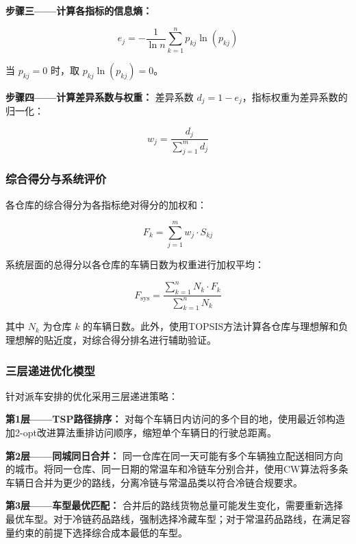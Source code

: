 \textbf{步骤三——计算各指标的信息熵：}

\begin{equation}\label{eq:entropy}
e_j = -\frac{1}{\ln n} \sum_{k=1}^{n} p_{kj} \ln(p_{kj})
\end{equation}

当 $p_{kj} = 0$ 时，取 $p_{kj}\ln(p_{kj}) = 0$。

\textbf{步骤四——计算差异系数与权重：} 差异系数 $d_j = 1 - e_j$，指标权重为差异系数的归一化：

\begin{equation}\label{eq:weight}
w_j = \frac{d_j}{\sum_{j=1}^{m} d_j}
\end{equation}

\subsubsection{综合得分与系统评价}

各仓库的综合得分为各指标绝对得分的加权和：

\begin{equation}\label{eq:composite}
F_k = \sum_{j=1}^{m} w_j \cdot S_{kj}
\end{equation}

系统层面的总得分以各仓库的车辆日数为权重进行加权平均：

\begin{equation}\label{eq:system}
F_{\mathrm{sys}} = \frac{\sum_{k=1}^{n} N_k \cdot F_k}{\sum_{k=1}^{n} N_k}
\end{equation}

其中 $N_k$ 为仓库 $k$ 的车辆日数。此外，使用TOPSIS方法\cite{hwang1981multiple}计算各仓库与理想解和负理想解的贴近度，对综合得分排名进行辅助验证。

\subsubsection{三层递进优化模型}

针对派车安排的优化采用三层递进策略：

\textbf{第1层——TSP路径排序：} 对每个车辆日内访问的多个目的地，使用最近邻构造加2-opt改进算法重排访问顺序\cite{lin1965computer}，缩短单个车辆日的行驶总距离。

\textbf{第2层——同城同日合并：} 同一仓库在同一天可能有多个车辆独立配送相同方向的城市。将同一仓库、同一日期的常温车和冷链车分别合并，使用CW算法\cite{clarke1964scheduling}将多条车辆日合并为更少的路线，分离冷链与常温品类以符合冷链合规要求。

\textbf{第3层——车型最优匹配：} 合并后的路线货物总量可能发生变化，需要重新选择最优车型。对于冷链药品路线，强制选择冷藏车型；对于常温药品路线，在满足容量约束的前提下选择综合成本最低的车型。
